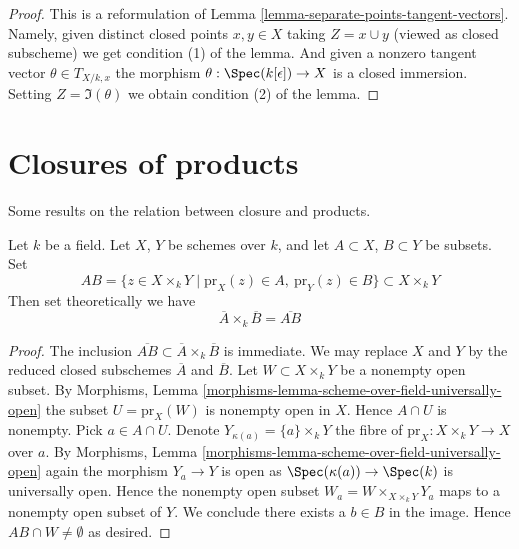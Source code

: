 \begin{proof}
This is a reformulation of
Lemma \ref{lemma-separate-points-tangent-vectors}.
Namely, given distinct closed points
$x, y \in X$ taking $Z = x \cup y$ (viewed as closed
subscheme) we get condition (1) of the lemma.
And given a nonzero tangent vector $\theta \in T_{X/k, x}$
the morphism $\theta : \Spec(k[\epsilon]) \to X$
is a closed immersion. Setting $Z = \Im(\theta)$
we obtain condition (2) of the lemma.
\end{proof}









\section{Closures of products}
\label{section-closure-of-products}

\noindent
Some results on the relation between closure and products.

\begin{lemma}
\label{lemma-closure-of-product}
Let $k$ be a field.
Let $X$, $Y$ be schemes over $k$, and let
$A \subset X$, $B \subset Y$ be subsets.
Set
$$
AB =
\{z \in X \times_k Y \mid \text{pr}_X(z) \in A, \ \text{pr}_Y(z) \in B\}
\subset X \times_k Y
$$
Then set theoretically we have
$$
\overline{A} \times_k \overline{B} = \overline{AB}
$$
\end{lemma}

\begin{proof}
The inclusion $\overline{AB} \subset \overline{A} \times_k \overline{B}$
is immediate.
We may replace $X$ and $Y$ by the reduced closed subschemes $\overline{A}$
and $\overline{B}$.
Let $W \subset X \times_k Y$ be a nonempty open subset. By
Morphisms, Lemma \ref{morphisms-lemma-scheme-over-field-universally-open}
the subset $U = \text{pr}_X(W)$ is nonempty open in $X$.
Hence $A \cap U$ is nonempty. Pick $a \in A \cap U$.
Denote $Y_{\kappa(a)} = \{a\} \times_k Y$
the fibre of $\text{pr}_X : X \times_k Y \to X$ over $a$. By
Morphisms, Lemma \ref{morphisms-lemma-scheme-over-field-universally-open}
again the morphism $Y_a \to Y$ is open as
$\Spec(\kappa(a)) \to \Spec(k)$ is universally open.
Hence the nonempty open
subset $W_a = W \times_{X \times_k Y} Y_a$
maps to a nonempty open subset of $Y$.
We conclude there exists a $b \in B$ in the image.
Hence $AB \cap W \not = \emptyset$ as desired.
\end{proof}

